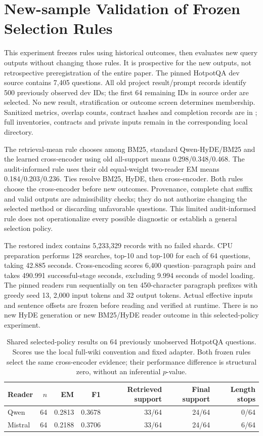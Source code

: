 \section{New-sample Validation of Frozen Selection Rules}
\label{sec:supp_independent_validation_new}
This experiment freezes rules using historical outcomes, then evaluates new query outputs without changing those rules. It is prospective for the new outputs, not retrospective preregistration of the entire paper. The pinned HotpotQA dev source contains 7,405 questions. All old project result/prompt records identify 500 previously observed dev IDs; the first 64 remaining IDs in source order are selected. No new result, stratification or outcome screen determines membership. Sanitized metrics, overlap counts, contract hashes and completion records are in ; full inventories, contracts and private inputs remain in the corresponding local directory.

The retrieval-mean rule chooses among BM25, standard Qwen-HyDE/BM25 and the learned cross-encoder using old all-support means 0.298/0.348/0.468. The audit-informed rule uses their old equal-weight two-reader EM means 0.184/0.203/0.236. Ties resolve BM25, HyDE, then cross-encoder. Both rules choose the cross-encoder before new outcomes. Provenance, complete chat suffix and valid outputs are admissibility checks; they do not authorize changing the selected method or discarding unfavorable questions. This limited audit-informed rule does not operationalize every possible diagnostic or establish a general selection policy.

The restored index contains 5,233,329 records with no failed shards. CPU preparation performs 128 searches, top-10 and top-100 for each of 64 questions, taking 42.885 seconds. Cross-encoding scores 6,400 question--paragraph pairs and takes 490.991 successful-stage seconds, excluding 9.994 seconds of model loading. The pinned readers run sequentially on ten 450-character paragraph prefixes with greedy seed 13, 2,000 input tokens and 32 output tokens. Actual effective inputs and sentence offsets are frozen before reading and verified at runtime. There is no new HyDE generation or new BM25/HyDE reader outcome in this selected-policy experiment.

\begin{table}[htbp]
\centering\footnotesize
\caption{Shared selected-policy results on 64 previously unobserved HotpotQA questions. Scores use the local full-wiki convention and fixed adapter. Both frozen rules select the same cross-encoder evidence; their performance difference is structural zero, without an inferential $p$-value.}
\label{tab:priority_independent_validation}
\begin{tabularx}{\textwidth}{l r r r r r r}
\toprule
Reader & $n$ & EM & F1 & Retrieved support & Final support & Length stops \\
\midrule
Qwen & 64 & 0.2813 & 0.3678 & 33/64 & 24/64 & 0/64 \\
Mistral & 64 & 0.2188 & 0.3706 & 33/64 & 24/64 & 6/64 \\
\bottomrule
\end{tabularx}
\end{table}

